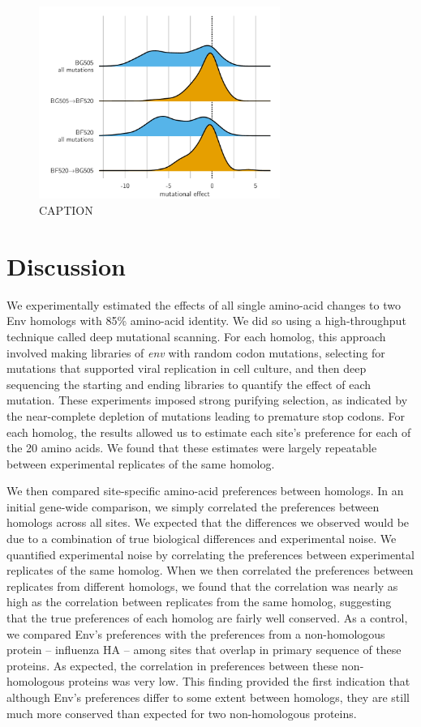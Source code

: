 \documentclass[9pt]{elife}
\begin{document}
\begin{figure}
\centerline{\includegraphics[clip=true, trim=0in 0in 0in 0.7in, width=0.7\textwidth]{figures/entrenchment.pdf}}
\caption{\label{fig:entrenchment}
CAPTION
}
\end{figure}


\section{Discussion}
We experimentally estimated the effects of all single amino-acid changes to two Env homologs with 85\% amino-acid identity.
We did so using a high-throughput technique called deep mutational scanning.
For each homolog, this approach involved making libraries of \textit{env} with random codon mutations, selecting for mutations that supported viral replication in cell culture, and then deep sequencing the starting and ending libraries to quantify the effect of each mutation.
These experiments imposed strong purifying selection, as indicated by the near-complete depletion of mutations leading to premature stop codons.
For each homolog, the results allowed us to estimate each site's preference for each of the 20 amino acids.
We found that these estimates were largely repeatable between experimental replicates of the same homolog.

We then compared site-specific amino-acid preferences between homologs.
In an initial gene-wide comparison, we simply correlated the preferences between homologs across all sites.
We expected that the differences we observed would be due to a combination of true biological differences and experimental noise.
We quantified experimental noise by correlating the preferences between experimental replicates of the same homolog.
When we then correlated the preferences between replicates from different homologs, we found that the correlation was nearly as high as the correlation between replicates from the same homolog, suggesting that the true preferences of each homolog are fairly well conserved.
As a control, we compared Env's preferences with the preferences from a non-homologous protein -- influenza HA -- among sites that overlap in primary sequence of these proteins.
As expected, the correlation in preferences between these non-homologous proteins was very low.
This finding provided the first indication that although Env's preferences differ to some extent between homologs, they are still much more conserved than expected for two non-homologous proteins.
\end{document}
